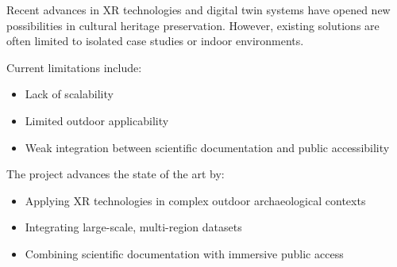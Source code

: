 Recent advances in XR technologies and digital twin systems have opened new possibilities in cultural heritage preservation. However, existing solutions are often limited to isolated case studies or indoor environments.

\medskip
Current limitations include:
\begin{itemize}
    \item Lack of scalability
    \item Limited outdoor applicability
    \item Weak integration between scientific documentation and public accessibility
\end{itemize}

The project advances the state of the art by:
\begin{itemize}
    \item Applying XR technologies in complex outdoor archaeological contexts
    \item Integrating large-scale, multi-region datasets
    \item Combining scientific documentation with immersive public access
\end{itemize}